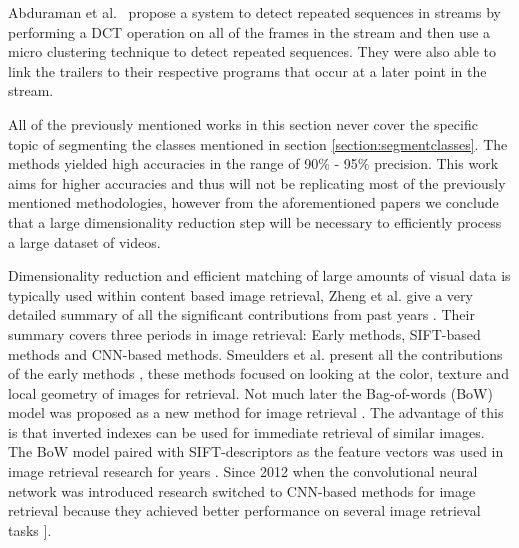 \documentclass{article}
\begin{document}
Abduraman et al.\ \cite{abduraman2011unsupervised} propose a system to detect repeated sequences in streams by performing a DCT operation on all of the frames in the stream and then use a micro clustering technique to detect repeated sequences. They were also able to link the trailers to their respective programs that occur at a later point in the stream.

All of the previously mentioned works in this section never cover the specific topic of segmenting the classes mentioned in section \ref{section:segmentclasses}. The methods yielded high accuracies in the range of 90\% - 95\% precision. This work aims for higher accuracies and thus will not be replicating most of the previously mentioned methodologies, however from the aforementioned papers we conclude that a large dimensionality reduction step will be necessary to efficiently process a large dataset of videos.

Dimensionality reduction and efficient matching of large amounts of visual data is typically used within content based image retrieval, Zheng et al. give a very detailed summary of all the significant contributions from past years \cite{zheng2018sift}. Their summary covers three periods in image retrieval: Early methods, SIFT-based methods and CNN-based methods. Smeulders et al. present all the contributions of the early methods \cite{smeulders2000content}, these methods focused on looking at the color, texture and local geometry of images for retrieval. Not much later the Bag-of-words (BoW) model was proposed as a new method for image retrieval \cite{sivic2003video}. The advantage of this is that inverted indexes can be used for immediate retrieval of similar images. The BoW model paired with SIFT-descriptors \cite{lowe2004distinctive} as the feature vectors was used in image retrieval research for years \cite{nister2006scalable}\cite{philbin2007object}\cite{jegou2008hamming}\cite{jegou2010aggregating}\cite{jegou2012aggregating}. Since 2012 when the convolutional neural network was introduced \cite{krizhevsky2012imagenet} research switched to CNN-based methods for image retrieval because they achieved better performance on several image retrieval tasks	 \cite{babenko2014neural}]\cite{yue2015exploiting}\cite{tolias2015particular}.


\iffalse
\cite{li2000automatic} %

\cite{lienhart1997detection} %
\cite{covell2006advertisement} %
\end{document}
